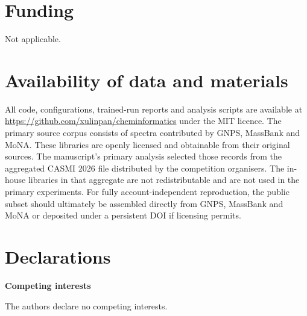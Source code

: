 \documentclass[11pt]{article}
\newcommand{\hd}[1]{\medskip\par\noindent\textbf{#1}\par\nobreak\vspace{2pt}\noindent\ignorespaces}
\begin{document}
\section*{Funding}
Not applicable.

\section*{Availability of data and materials}
All code, configurations, trained-run reports and analysis scripts are available at \url{https://github.com/xulinpan/cheminformatics} under the MIT licence. The primary source corpus consists of spectra contributed by GNPS, MassBank and MoNA. These libraries are openly licensed and obtainable from their original sources. The manuscript's primary analysis selected those records from the aggregated CASMI 2026 file distributed by the competition organisers. The in-house libraries in that aggregate are not redistributable and are not used in the primary experiments. For fully account-independent reproduction, the public subset should ultimately be assembled directly from GNPS, MassBank and MoNA or deposited under a persistent DOI if licensing permits.

\section*{Declarations}
\hd{Competing interests} The authors declare no competing interests.
\end{document}
